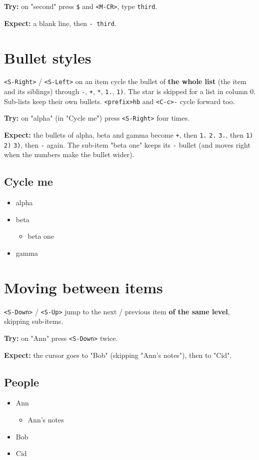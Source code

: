 \textbf{Try:} on "second" press \texttt{\$} and \texttt{<M-CR>}, type \texttt{third}.

\textbf{Expect:} a blank line, then \texttt{- third}.
\section{Bullet styles}
\label{sec:org1183b91}
\texttt{<S-Right>} / \texttt{<S-Left>} on an item cycle the bullet of \textbf{the whole list}
(the item and its siblings) through \texttt{-}, \texttt{+}, \texttt{*}, \texttt{1.}, \texttt{1)}. The star is
skipped for a list in column 0. Sub-lists keep their own bullets.
\texttt{<prefix>hb} and \texttt{<C-c>-} cycle forward too.

\textbf{Try:} on "alpha" (in "Cycle me") press \texttt{<S-Right>} four times.

\textbf{Expect:} the bullets of alpha, beta and gamma become \texttt{+}, then \texttt{1.} \texttt{2.}
\texttt{3.}, then \texttt{1)} \texttt{2)} \texttt{3)}, then \texttt{-} again. The sub-item "beta one" keeps its
\texttt{-} bullet (and moves right when the numbers make the bullet wider).
\subsection{Cycle me}
\label{sec:org6852f3b}
\begin{itemize}
\item alpha
\item beta
\begin{itemize}
\item beta one
\end{itemize}
\item gamma
\end{itemize}
\section{Moving between items}
\label{sec:orgc4eb537}
\texttt{<S-Down>} / \texttt{<S-Up>} jump to the next / previous item \textbf{of the same level},
skipping sub-items.

\textbf{Try:} on "Ann" press \texttt{<S-Down>} twice.

\textbf{Expect:} the cursor goes to "Bob" (skipping "Ann's notes"), then to "Cid".
\subsection{People}
\label{sec:org1a9b2bc}
\begin{itemize}
\item Ann
\begin{itemize}
\item Ann's notes
\end{itemize}
\item Bob
\item Cid
\end{itemize}
